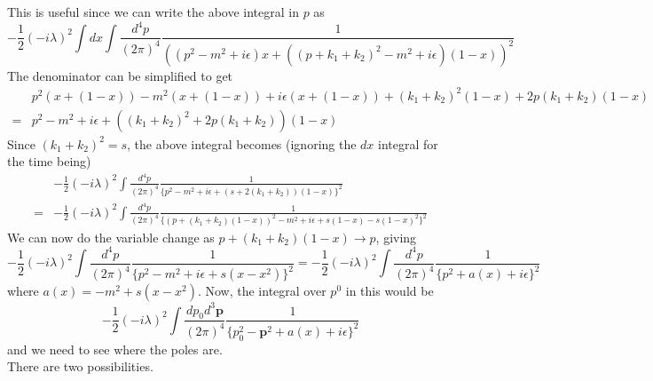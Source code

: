 \documentclass[11pt, notitlepage]{report}
\numberwithin{equation}{section}
\begin{document}
This is useful since we can write the above integral in \(p\) as 
\begin{equation*}
    -\frac{1}{2}(-i\lambda)^2 \int dx  \int \frac{d^4p}{(2\pi)^4} \frac{1}{\left((p^2 - m^2 + i\epsilon)x + \left((p+k_1+k_2)^2 - m^2 +i\epsilon \right)(1-x)\right)^2}
\end{equation*}
The denominator can be simplified to get 
\begin{align*}
    &p^2(x + (1-x)) - m^2(x + (1-x)) + i\epsilon(x + (1-x)) + (k_1 + k_2)^2(1-x) + 2p(k_1+k_2)(1-x)\\
    =& p^2 - m^2 + i\epsilon +((k_1+k_2)^2 + 2p(k_1+k_2))(1-x)
\end{align*}
Since \((k_1 + k_2)^2 = s\), the above integral becomes (ignoring the \(dx\) integral for the time being)
\begin{align*}
    &-\frac{1}{2}(-i\lambda)^2  \int \frac{d^4p}{(2\pi)^4} \frac{1}{\{p^2 - m^2 + i\epsilon +(s + 2(k_1+k_2))(1-x)\}^2} \\
    = & -\frac{1}{2}(-i\lambda)^2  \int \frac{d^4p}{(2\pi)^4} \frac{1}{\{(p + (k_1 + k_2)(1-x))^2 - m^2 + i\epsilon + s(1-x) - s(1-x)^2\}^2}
\end{align*}
We can now do the variable change as \(p + (k_1 + k_2)(1-x) \to p\), giving 
\begin{equation*}
    -\frac{1}{2}(-i\lambda)^2  \int \frac{d^4p}{(2\pi)^4} \frac{1}{\{p^2 - m^2 + i\epsilon + s(x-x^2)\}^2} = -\frac{1}{2}(-i\lambda)^2  \int \frac{d^4p}{(2\pi)^4} \frac{1}{\{p^2 + a(x) + i\epsilon\}^2}
\end{equation*}
where \(a(x) = -m^2 + s(x- x^2)\). Now, the integral over \(p^0\) in this would be 
\begin{equation*}
    -\frac{1}{2}(-i\lambda)^2  \int \frac{dp_0 d^3\textbf{p}}{(2\pi)^4} \frac{1}{\{p_0^2 - \textbf{p}^2 + a(x) + i\epsilon\}^2}
\end{equation*}
and we need to see where the poles are. \\
There are two possibilities. 
\end{document}
